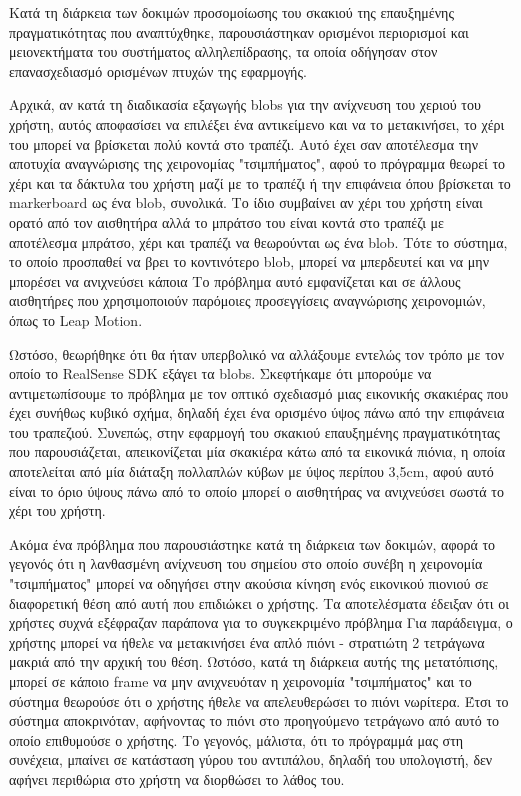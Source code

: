 Κατά τη διάρκεια των δοκιμών προσομοίωσης του σκακιού της επαυξημένης πραγματικότητας που αναπτύχθηκε, παρουσιάστηκαν ορισμένοι περιορισμοί και μειονεκτήματα του συστήματος αλληλεπίδρασης, τα οποία οδήγησαν στον επανασχεδιασμό ορισμένων πτυχών της εφαρμογής. 


Αρχικά, αν κατά τη διαδικασία εξαγωγής blobs για την ανίχνευση του χεριού του χρήστη, αυτός αποφασίσει να επιλέξει ένα αντικείμενο και να το μετακινήσει, το χέρι του μπορεί να βρίσκεται πολύ κοντά στο τραπέζι. Αυτό έχει σαν αποτέλεσμα την αποτυχία αναγνώρισης της χειρονομίας "τσιμπήματος", αφού το πρόγραμμα θεωρεί το χέρι και τα δάκτυλα του χρήστη μαζί με το τραπέζι ή την επιφάνεια όπου βρίσκεται το markerboard ως ένα blob, συνολικά. Το ίδιο συμβαίνει αν χέρι του χρήστη είναι ορατό από τον αισθητήρα αλλά το μπράτσο του είναι κοντά στο τραπέζι με αποτέλεσμα μπράτσο, χέρι και τραπέζι να θεωρούνται ως ένα blob. Τότε το σύστημα, το οποίο προσπαθεί να βρει το κοντινότερο blob, μπορεί να μπερδευτεί και να μην μπορέσει να ανιχνεύσει κάποια Το πρόβλημα αυτό εμφανίζεται και σε άλλους αισθητήρες που χρησιμοποιούν παρόμοιες προσεγγίσεις αναγνώρισης χειρονομιών, όπως το Leap Motion. 

Ωστόσο, θεωρήθηκε ότι θα ήταν υπερβολικό να αλλάξουμε εντελώς τον τρόπο με τον οποίο το RealSense SDK εξάγει τα blobs. Σκεφτήκαμε ότι μπορούμε να αντιμετωπίσουμε το πρόβλημα με τον οπτικό σχεδιασμό μιας εικονικής σκακιέρας που έχει συνήθως κυβικό σχήμα, δηλαδή έχει ένα ορισμένο ύψος πάνω από την επιφάνεια του τραπεζιού. Συνεπώς, στην εφαρμογή του σκακιού επαυξημένης πραγματικότητας που παρουσιάζεται, απεικονίζεται μία σκακιέρα κάτω από τα εικονικά πιόνια, η οποία αποτελείται από μία διάταξη πολλαπλών κύβων με ύψος περίπου 3,5cm, αφού αυτό είναι το όριο ύψους πάνω από το οποίο μπορεί ο αισθητήρας να ανιχνεύσει σωστά το χέρι του χρήστη. 


Ακόμα ένα πρόβλημα που παρουσιάστηκε κατά τη διάρκεια των δοκιμών, αφορά το γεγονός ότι η λανθασμένη ανίχνευση του σημείου στο οποίο συνέβη η χειρονομία "τσιμπήματος" μπορεί να οδηγήσει στην ακούσια κίνηση ενός εικονικού πιονιού σε διαφορετική θέση από αυτή που επιδιώκει ο χρήστης. Τα αποτελέσματα έδειξαν ότι οι χρήστες συχνά εξέφραζαν παράπονα για το συγκεκριμένο πρόβλημα Για παράδειγμα, ο χρήστης μπορεί να ήθελε να μετακινήσει ένα απλό πιόνι - στρατιώτη 2 τετράγωνα μακριά από την αρχική του θέση. Ωστόσο, κατά τη διάρκεια αυτής της μετατόπισης, μπορεί σε κάποιο frame να μην ανιχνευόταν η χειρονομία "τσιμπήματος" και το σύστημα θεωρούσε ότι ο χρήστης ήθελε να απελευθερώσει το πιόνι νωρίτερα. Έτσι το σύστημα αποκρινόταν, αφήνοντας το πιόνι στο προηγούμενο τετράγωνο από αυτό το οποίο επιθυμούσε ο χρήστης. Το γεγονός, μάλιστα, ότι το πρόγραμμά μας στη συνέχεια, μπαίνει σε κατάσταση γύρου του αντιπάλου, δηλαδή του υπολογιστή, δεν αφήνει περιθώρια στο χρήστη να διορθώσει το λάθος του. 


